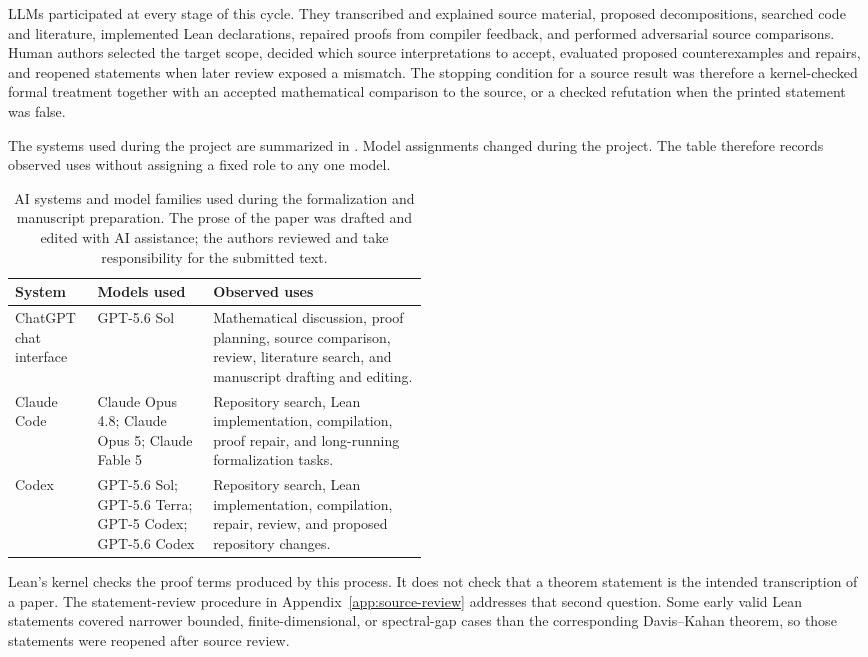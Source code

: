 LLMs participated at every stage of this cycle.  They transcribed and explained
source material, proposed decompositions, searched code and literature,
implemented Lean declarations, repaired proofs from compiler feedback, and
performed adversarial source comparisons.  Human authors selected the target
scope, decided which source interpretations to accept, evaluated proposed
counterexamples and repairs, and reopened statements when later review exposed
a mismatch.  The stopping condition for a source result was therefore a
kernel-checked formal treatment together with an accepted mathematical
comparison to the source, or a checked refutation when the printed statement
was false.

The systems used during the project are summarized in
.  Model assignments changed during the
project.  The table therefore records observed uses without assigning a fixed
role to any one model.

\begin{table}[H]
\centering
\small
\begin{tabularx}{\linewidth}{>{\raggedright\arraybackslash}p{0.20\linewidth}>{\raggedright\arraybackslash}p{0.28\linewidth}X}
\toprule
System & Models used & Observed uses \\
\midrule
ChatGPT chat interface & GPT-5.6 Sol & Mathematical discussion, proof planning, source comparison, review, literature search, and manuscript drafting and editing. \\
Claude Code & Claude Opus 4.8; Claude Opus 5; Claude Fable 5 & Repository search, Lean implementation, compilation, proof repair, and long-running formalization tasks. \\
Codex & GPT-5.6 Sol; GPT-5.6 Terra; GPT-5 Codex; GPT-5.6 Codex & Repository search, Lean implementation, compilation, repair, review, and proposed repository changes. \\
\bottomrule
\end{tabularx}
\caption{AI systems and model families used during the formalization and
manuscript preparation.  The prose of the paper was drafted and edited with AI
assistance; the authors reviewed and take responsibility for the submitted
text.}
\label{tab:formalization-systems}
\end{table}

Lean's kernel checks the proof terms produced by this process.  It does not
check that a theorem statement is the intended transcription of a paper.  The
statement-review procedure in Appendix~\ref{app:source-review} addresses that
second question.  Some early valid Lean statements covered narrower bounded,
finite-dimensional, or spectral-gap cases than the corresponding
Davis--Kahan theorem, so those statements were reopened after source review.

